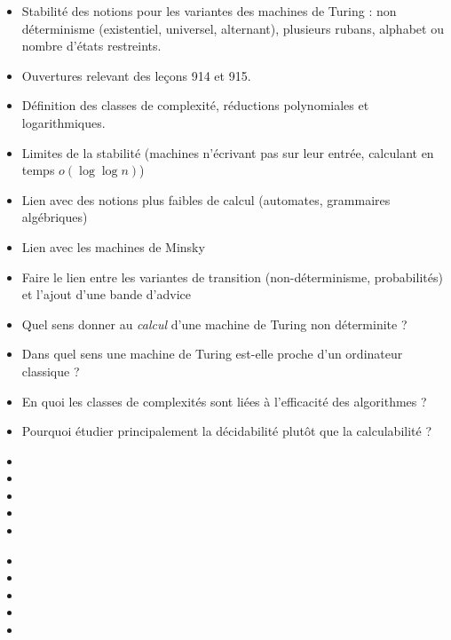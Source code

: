 \documentclass{agregfiche}
\begin{document}
\secidees

\begin{itemize}
    \item Stabilité des notions pour les variantes des machines de Turing : non
        déterminisme (existentiel, universel, alternant), 
        plusieurs rubans, alphabet ou nombre d'états restreints.
    \item Ouvertures relevant des leçons 914 et 915.
    \item Définition des classes de complexité, réductions polynomiales et logarithmiques.
    \item Limites de la stabilité (machines n'écrivant pas sur leur entrée,
        calculant en temps $o(\log \log n)$)
    \item Lien avec des notions plus faibles de calcul (automates, grammaires
        algébriques)
    \item Lien avec les machines de Minsky
    \item Faire le lien entre les variantes de transition (non-déterminisme,
        probabilités) et l'ajout d'une bande d'advice
\end{itemize}

\secquestionsclassiques

\begin{itemize}
    \item Quel sens donner au \emph{calcul} d'une machine de Turing non
        déterminite ?
    \item Dans quel sens une machine de Turing est-elle proche d'un ordinateur
        classique ?
    \item En quoi les classes de complexités sont liées à l'efficacité des
        algorithmes ?
    \item Pourquoi étudier principalement la décidabilité plutôt que la
        calculabilité ?
\end{itemize}

\secreferences

\begin{itemize}
    \item 
    \item {}
    \item {}
    \item {}
    \item {}
\end{itemize}


\secdev

\begin{itemize}
    \item {}
    \item {}
    \item {}
    \item {}
    \item {}
\end{itemize}
\end{document}

